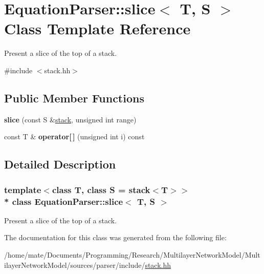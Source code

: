 \hypertarget{classEquationParser_1_1slice}{}\section{Equation\+Parser\+:\+:slice$<$ T, S $>$ Class Template Reference}
\label{classEquationParser_1_1slice}


Present a slice of the top of a stack.  




{\ttfamily \#include $<$stack.\+hh$>$}

\subsection*{Public Member Functions}
\begin{DoxyCompactItemize}
\item 
{\bfseries slice} (const S \&\hyperlink{classEquationParser_1_1stack}{stack}, unsigned int range)\hypertarget{classEquationParser_1_1slice_aa6e11d2a5286d4c024712d20c695d84e}{}\label{classEquationParser_1_1slice_aa6e11d2a5286d4c024712d20c695d84e}

\item 
const T \& {\bfseries operator\mbox{[}$\,$\mbox{]}} (unsigned int i) const \hypertarget{classEquationParser_1_1slice_a19f1344bb2a3e5a354233063389d09b2}{}\label{classEquationParser_1_1slice_a19f1344bb2a3e5a354233063389d09b2}

\end{DoxyCompactItemize}


\subsection{Detailed Description}
\subsubsection*{template$<$class T, class S = stack$<$\+T$>$$>$\\*
class Equation\+Parser\+::slice$<$ T, S $>$}

Present a slice of the top of a stack. 

The documentation for this class was generated from the following file\+:\begin{DoxyCompactItemize}
\item 
/home/mate/\+Documents/\+Programming/\+Research/\+Multilayer\+Network\+Model/\+Multilayer\+Network\+Model/sources/parser/include/\hyperlink{stack_8hh}{stack.\+hh}\end{DoxyCompactItemize}
